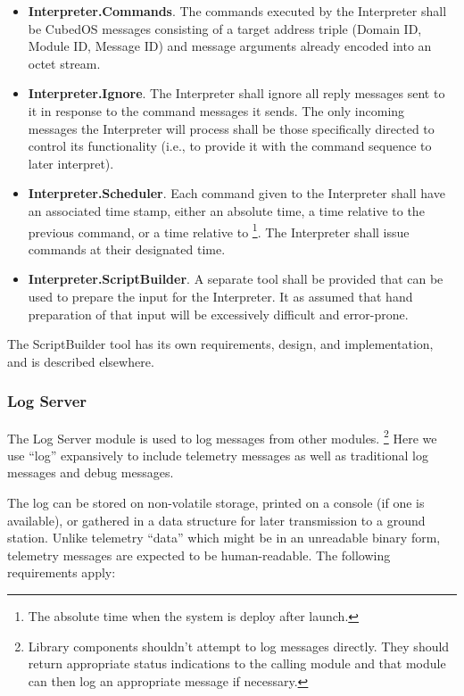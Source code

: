 \begin{itemize}
\item \textbf{Interpreter.Commands}. The commands executed by the Interpreter shall be CubedOS
  messages consisting of a target address triple (Domain ID, Module ID, Message ID) and message
  arguments already encoded into an octet stream.
\item \textbf{Interpreter.Ignore}. The Interpreter shall ignore all reply messages sent to it in
  response to the command messages it sends. The only incoming messages the Interpreter will
  process shall be those specifically directed to control its functionality (i.e., to provide it
  with the command sequence to later interpret).
\item \textbf{Interpreter.Scheduler}. Each command given to the Interpreter shall have an
  associated time stamp, either an absolute time, a time relative to the previous command, or a
  time relative to \footnote{The absolute time when the system is
    deploy after launch.}. The Interpreter shall issue commands at their designated time.
\item \textbf{Interpreter.ScriptBuilder}. A separate tool shall be provided that can be used to
  prepare the input for the Interpreter. It as assumed that hand preparation of that input will
  be excessively difficult and error-prone.
\end{itemize}

The ScriptBuilder tool has its own requirements, design, and implementation, and is described
elsewhere.

\subsubsection{Log Server}
\label{sec:requirements-log-server}

The Log Server module is used to log messages from other modules. \footnote{Library components
shouldn't attempt to log messages directly. They should return appropriate status indications to
the calling module and that module can then log an appropriate message if necessary.} Here we
use ``log'' expansively to include telemetry messages as well as traditional log messages and
debug messages.

The log can be stored on non-volatile storage, printed on a console (if one is available), or
gathered in a data structure for later transmission to a ground station. Unlike telemetry
``data'' which might be in an unreadable binary form, telemetry messages are expected to be
human-readable. The following requirements apply:

